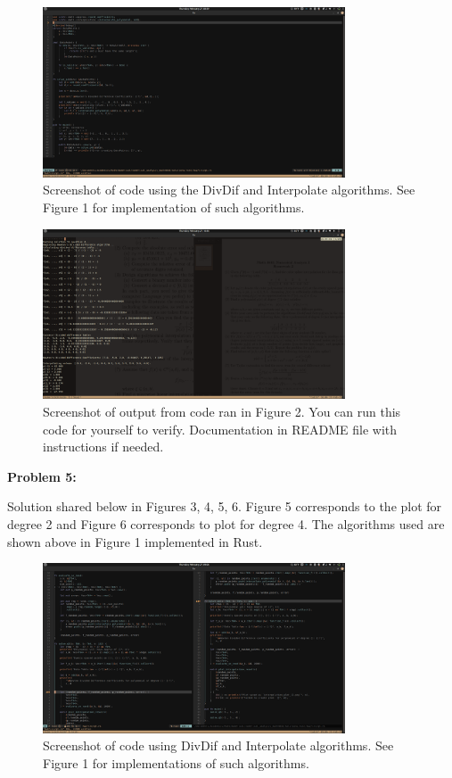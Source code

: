 \documentclass[12pt, letterpaper]{article}
\theoremstyle{nonumberplain}
\begin{document}
\begin{figure}[!htbp]
	\centering
	\includegraphics[width=0.8\textwidth]{numhw2q4.png}
	\caption{Screenshot of code using the DivDif and Interpolate algorithms. See Figure 1 for implementation of such algorithms.}
\end{figure}

\begin{figure}[!htbp]
	\centering
	\includegraphics[width=0.8\textwidth]{numhw2q4_output.png}
	\caption{Screenshot of output from code ran in Figure 2. You can run this code for yourself to verify. Documentation in README file with instructions if needed.}
\end{figure}
\clearpage

\hspace{18pt}\textbf{Problem 5:} \medskip

Solution shared below in Figures 3, 4, 5, 6. Figure 5 corresponds to the plot for degree 2 and Figure 6 corresponds to plot for degree 4. The algorithms used are shown above in Figure 1 implemented in Rust.

\begin{figure}[!htbp]
	\centering
	\includegraphics[width=0.8\textwidth]{numhw2q5.png}
	\caption{Screenshot of code using DivDif and Interpolate algorithms. See Figure 1 for implementations of such algorithms.}
\end{figure}
\end{document}
